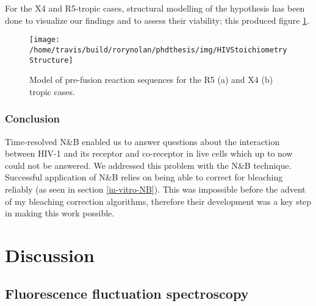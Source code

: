 \documentclass[12pt,]{book}
\theoremstyle{definition}
\theoremstyle{definition}
\theoremstyle{definition}
\theoremstyle{remark}
\begin{document}
For the X4 and R5-tropic cases, structural modelling of the hypothesis
has been done to visualize our findings and to assess their viability;
this produced figure \ref{fig:HIVStoichiometryStructure}.




\begin{figure}

\texttt{[image: /home/travis/build/rorynolan/phdthesis/img/HIVStoichiometryStructure]} \hfill{}

\caption{Model of pre-fusion reaction
sequences for the R5 (a) and X4 (b) tropic cases.}\label{fig:HIVStoichiometryStructure}
\end{figure}

\subsection{Conclusion}\label{conclusion}

Time-resolved N\&B enabled us to answer questions about the interaction
between HIV-1 and its receptor and co-receptor in live cells which up to
now could not be answered. We addressed this problem with the N\&B
technique. Successful application of N\&B relies on being able to
correct for bleaching reliably (as seen in section \ref{in-vitro-NB}).
This was impossible before the advent of my bleaching correction
algorithms, therefore their development was a key step in making this
work possible.

\chapter{Discussion}\label{discussion}

\section{Fluorescence fluctuation
spectroscopy}\label{fluorescence-fluctuation-spectroscopy}
\end{document}
